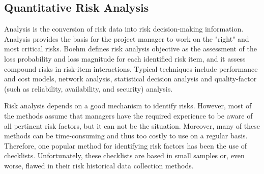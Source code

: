 \subsection{Quantitative Risk Analysis}

Analysis is the conversion of risk data into risk decision-making information. Analysis provides the basis for the project manager to work on the "right" and most critical risks. Boehm \cite{BOEHM1991} defines risk analysis objective as the assessment of the loss probability and loss magnitude for each identified risk item, and it assess compound risks in risk-item interactions. Typical techniques include performance and cost models, network analysis, statistical decision analysis and quality-factor (such as reliability, availability, and security) analysis.

Risk analysis depends on a good mechanism to identify risks. However, most of the methods assume that managers have the required experience to be aware of all pertinent risk factors, but it can not be the situation. Moreover, many of these methods can be time-consuming and thus too costly to use on a regular basis. Therefore, one popular method for identifying risk factors has been the use of checklists. Unfortunately, these checklists are based in small samples or, even worse, flawed in their risk historical data collection methods.

